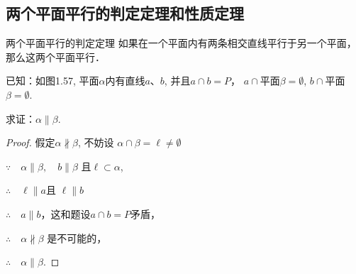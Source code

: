 \subsection{两个平面平行的判定定理和性质定理}
\begin{blk}{两个平面平行的判定定理} 
  如果在一个平面内有两条相交直线平行于另一个平面，那么这两个平面平行．
\end{blk}

已知：如图1.57, 平面$\alpha$内有直线$a$、$b$, 并且$a\cap b=P$，
$a\cap $平面$\beta=\emptyset$, 
$b\cap$平面$\beta=\emptyset$.

求证：$\alpha\parallel \beta$.


\begin{proof}
  假定$\alpha\nparallel \beta$, 不妨设
$\alpha\cap\beta=\ell\ne \emptyset$

$\because\quad \alpha\parallel \beta,\quad b\parallel \beta$ 且$\ell\subset\alpha$,

$\therefore\quad \ell \parallel a$且 $\ell\parallel b$

$\therefore\quad a\parallel b$，这和题设$a\cap b=P$矛盾，

$\therefore\quad \alpha\nparallel \beta$ 是不可能的，

$\therefore\quad \alpha\parallel \beta$.
\end{proof}

